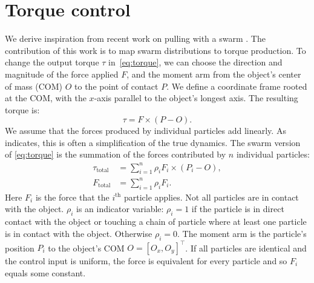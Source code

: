 \section{Torque control}
\label{sec:theory}

We derive inspiration from recent work on pulling with a swarm \cite{pulltogether}. The contribution of this work is to map swarm distributions to torque production.
To change the output torque $\tau$ in~\eqref{eq:torque}, we can choose the direction and magnitude of the force applied $F$, and the moment arm from the object's center of mass (COM) $O$ to the point of contact $P$.
We define a coordinate frame rooted at the COM, with the $x$-axis parallel to the object's longest axis. The resulting torque is:
%
\begin{equation}
\tau = F \times (P - O ).\label{eq:torque}
\end{equation}
%
We assume that the forces produced by individual particles add linearly. 
 As \cite{pulltogether} indicates, this is often a simplification of the true dynamics. 
 The swarm version of \eqref{eq:torque} is the summation of the forces contributed by $n$ individual particles:
\begin{align}
\tau_{\text{total}} &= \sum\limits_{i=1}^n \rho_i F_i \times (P_i - O ),   \label{eq:swarmtorque}\\
F_{\text{total}} &= \sum\limits_{i=1}^n \rho_i F_i.  \label{eq:swarmforce}
\end{align}
Here $F_i$ is the force that the $i^{\textrm{th}}$ particle applies. 
Not all particles are in contact with the object.  
$\rho_i$ is an indicator variable: $\rho_i=1$ if the particle is in direct contact with the object or touching a chain of particle where at least one particle is in contact with the object. 
 Otherwise $\rho_i = 0$.
The moment arm is the particle's position $P_i$ to the object's COM $O=[O_x,O_y]^{\top}$. 
 If all particles are identical and the control input is uniform, the force is equivalent for every particle and so $F_i $ equals some constant.
%
